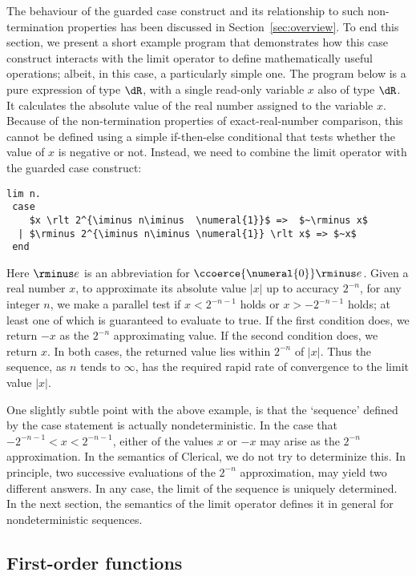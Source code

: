 The behaviour of the guarded case construct and its relationship to such non-termination properties has been discussed in Section~\ref{sec:overview}. To end this section, we present  a short example program that demonstrates how this case construct interacts with the limit operator to define mathematically useful operations; albeit, in this case, a particularly simple one. The program below is a pure expression of type $\dR$, with a single read-only variable $x$ also of type $\dR$.  It calculates the absolute value of the real number assigned to the variable $x$. Because of the non-termination properties of exact-real-number comparison, this cannot be defined using a simple if-then-else conditional that tests whether the value of $x$ is negative or not. Instead, we need to combine the limit operator with the guarded case construct:
%
\begin{lstlisting}
lim n.
 case
    $x \rlt 2^{\iminus n\iminus  \numeral{1}}$ =>  $~\rminus x$ 
  | $\rminus 2^{\iminus n\iminus \numeral{1}} \rlt x$ => $~x$
 end
\end{lstlisting}
%
Here $\rminus e$ is an abbreviation for $\ccoerce{\numeral{0}} \rminus e$.
Given a real number $x$, to approximate its absolute value $|x|$ up to accuracy $2^{-n}$, for any integer $n$, we make a parallel test if $x < 2^{-n-1}$ holds or $x > -2^{-n-1}$ holds;  at least one of which is guaranteed to evaluate to true. 
If the first condition does, we return $-x$ as the $2^{-n}$ approximating value.
If the second condition does, we return $x$. 
In both cases, the returned value lies within $2^{-n}$ of $|x|$. Thus 
the sequence, as $n$ tends to $\infty$, has the required rapid rate of convergence to the limit value  $|x|$.

One slightly subtle point with the above example, is that the `sequence' defined by the case statement is actually nondeterministic. 
In the case that $-2^{-n-1} < x < 2^{-n-1}$, either of the values $x$ or $-x$ may arise as the $2^{-n}$ approximation. In the semantics of Clerical, we do not try to determinize this. In principle, two successive evaluations of the  $2^{-n}$ approximation, may yield two different answers. In any case, the limit of the sequence is uniquely determined. 
In the next section, 
the semantics of the limit operator defines it in general for nondeterministic sequences.


\subsection{First-order functions}
\label{sec:first-order-func}

